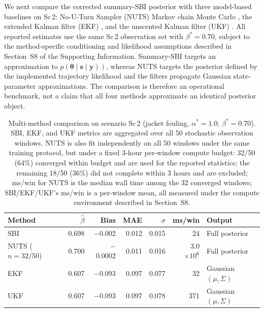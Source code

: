 \documentclass[aps,pre,twocolumn,superscriptaddress,floatfix]{revtex4-2}
\begin{document}
We next compare the corrected summary-SBI posterior with three model-based baselines
on Sc\,2: No-U-Turn Sampler (NUTS) Markov chain 
Monte Carlo \citep{Hoffman2014,galin_l__jones_610ba213}, the extended Kalman
filter (EKF) \citep{lee1994extended}, and the unscented Kalman filter 
(UKF) \citep{wan2000unscented}. All reported estimates use the same
Sc\,2 observation set with $\beta^*=0.70$, subject to the method-specific 
conditioning and likelihood assumptions described in Section~S8 of the 
Supporting Information. Summary-SBI targets an approximation to
$p(\boldsymbol{\theta}\mid\mathbf{s}(\mathbf{y}))$, whereas NUTS targets 
the posterior defined by the implemented trajectory likelihood and the filters 
propagate Gaussian state-parameter approximations. The comparison is therefore
an operational benchmark, 
not a claim that all four methods approximate an identical posterior object.
\begin{table}[t]
\centering
\caption{Multi-method comparison on scenario
Sc\,2 (jacket fouling, $\alpha^*=1.0$, $\beta^*=0.70$).
SBI, EKF, and UKF metrics are aggregated over all 50 stochastic observation
windows. NUTS is also fit independently on all 50 windows under the same
training protocol, but under a fixed 3-hour per-window compute budget: 32/50
(64\%) converged within budget and are used for the reported statistics; the
remaining 18/50 (36\%) did not complete within 3 hours and are excluded; 
ms/win for NUTS is the median
wall time among the 32 converged windows; SBI/EKF/UKF's ms/win is a per-window
mean, all measured under the compute environment described in Section~S8.
}
  \label{tab:method_comparison}
  \small \begin{tabular}{lrrrrrl} \toprule Method & $\hat{\beta}$ & Bias & MAE & $\sigma$ & ms/win & Output \\
    \midrule SBI & 0.698 & $-$0.002 & 0.012 & 0.015 & 24 & Full posterior \\
    NUTS ($n=32/50$) & 0.700 & $-$0.0002 & 0.011 & 0.016 & 3.0 $\times 10^6$ & Full posterior \\
    EKF & 0.607 & $-$0.093 & 0.097 & 0.077 & 32 & Gaussian $(\mu,\Sigma)$ \\
    UKF & 0.607 & $-$0.093 & 0.097 & 0.078 & 371 & Gaussian $(\mu,\Sigma)$ \\
    \bottomrule
  \end{tabular}
\end{table}
\end{document}
